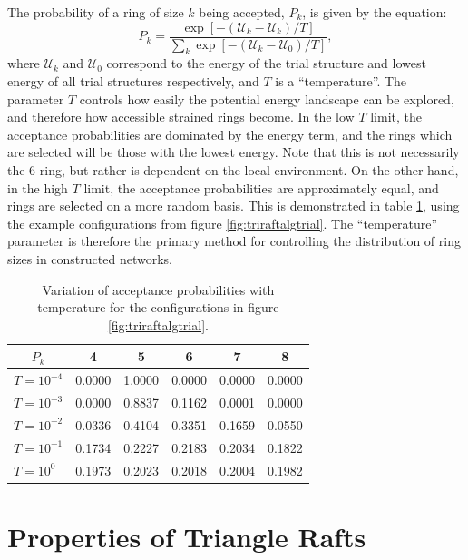 \noindent The probability of a ring of size $k$ being accepted, $P_k$, is given by the equation:
\begin{equation}
	\label{eq:probdist}
	P_k=\frac{ \exp{\left[-\left(\mathcal{U}_{k}-\mathcal{U}_k\right)/T\right]}}{\sum\limits_{k}\exp{\left[-\left(\mathcal{U}_{k}-\mathcal{U}_{0}\right)/T\right]}},
\end{equation}
where $\mathcal{U}_k$ and $\mathcal{U}_{0}$ correspond to the energy of the trial structure and lowest energy of all trial structures respectively, and $T$ is a ``temperature''. 
The parameter $T$ controls how easily the potential energy landscape can be explored, and therefore how accessible strained rings become. 
In the low $T$ limit, the acceptance probabilities are dominated by the energy term, and the rings which are selected will be those with the lowest energy. 
Note that this is not necessarily the 6-ring, but rather is dependent on the local environment. On the other hand, in the high $T$ limit, the acceptance probabilities are approximately equal, and rings are selected on a more random basis. 
This is demonstrated in table \ref{tab:prob}, using the example configurations from figure \ref{fig:triraftalgtrial}. 
The ``temperature'' parameter is therefore the primary method for controlling the distribution of ring sizes in constructed networks.



\begin{table}[bt]
	\centering
	\caption{Variation of acceptance probabilities with temperature for the configurations in figure \ref{fig:triraftalgtrial}.}
	\label{tab:prob}
	\begin{tabular}{c c c c c c}
	\toprule
	$P_{k}$ & 4 & 5 & 6 & 7 & 8 \\[0.5mm]
	\midrule
	$T=10^{-4}$ & 0.0000 & 1.0000 & 0.0000 & 0.0000 & 0.0000 \\[0.5mm]
	$T=10^{-3}$ & 0.0000 & 0.8837 & 0.1162 & 0.0001 & 0.0000 \\[0.5mm]
	$T=10^{-2}$ & 0.0336& 0.4104 & 0.3351 & 0.1659 & 0.0550 \\[0.5mm]
	$T=10^{-1}$ & 0.1734 & 0.2227 & 0.2183 & 0.2034 & 0.1822 \\[0.5mm]
	$T=10^{0}\;\;$ & 0.1973 & 0.2023 & 0.2018 & 0.2004 & 0.1982 \\[0.5mm] 
	\bottomrule	
	\end{tabular}
\end{table}

\section{Properties of Triangle Rafts}

